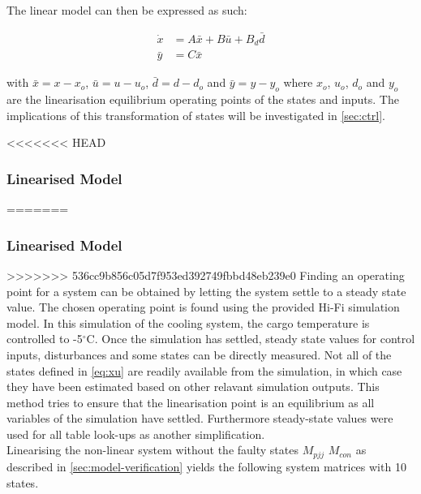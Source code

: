 The linear model can then be expressed as such:

\begin{equation} \label{eq:state_space_linear}
	\begin{split}
		\dot{x} & = A\bar{x} + B\bar{u} + B_d\bar{d} \\
		\bar{y} & = C\bar{x}
	\end{split}
\end{equation}

with $\bar{x} = x-x_o$, $\bar{u} = u-u_o$, $\bar{d} = d-d_o$ and $\bar{y} = y-y_o$ where $x_o$, $u_o$, $d_o$ and $y_o$ are the linearisation equilibrium operating points of the states and inputs. The implications of this transformation of states will be investigated in \cref{sec:ctrl}.

<<<<<<< HEAD
\subsubsection{Linearised Model} \label{sec:linearised-model}
=======
\subsubsection{Linearised Model}\label{sec:linearised-model}
>>>>>>> 536cc9b856c05d7f953ed392749fbbd48eb239e0
Finding an operating point for a system can be obtained by letting the system settle to a steady state value. The chosen operating point is found using the provided Hi-Fi simulation model. In this simulation of the cooling system, the cargo temperature is controlled to -5$^{\circ}$C. Once the simulation has settled, steady state values for control inputs, disturbances and some states can be directly measured. Not all of the states defined in \cref{eq:xu} are readily available from the simulation, in which case they have been estimated based on other relavant simulation outputs. This method tries to ensure that the linearisation point is an equilibrium as all variables of the simulation have settled. Furthermore steady-state values were used for all table look-ups as another simplification.\\

Linearising the non-linear system without the faulty states $ M_{pjj} $ $ M_{con} $ as described in \cref{sec:model-verification} yields the following system matrices with 10 states.


